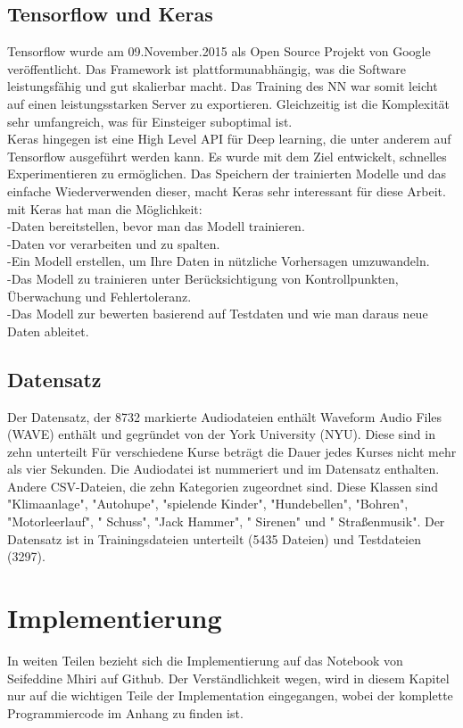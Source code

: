 \documentclass[a4paper,11pt]{article}
\theoremstyle{mytheor}
\begin{document}
\subsection{Tensorflow und Keras}
Tensorflow wurde am 09.November.2015 als Open Source Projekt
von Google veröffentlicht. Das Framework ist plattformunabhängig, was die Software leistungsfähig und gut skalierbar macht. Das Training des NN war somit leicht auf einen leistungsstarken Server zu exportieren. Gleichzeitig ist die Komplexität sehr umfangreich, was für Einsteiger suboptimal ist.\\
Keras hingegen ist eine High Level API für Deep learning, die unter anderem auf Tensorflow ausgeführt werden kann. Es wurde mit dem Ziel entwickelt, schnelles Experimentieren zu ermöglichen. Das Speichern der trainierten Modelle und das einfache Wiederverwenden dieser, macht Keras sehr interessant für diese Arbeit.\cite{Keras} 
\\ mit Keras hat man die Möglichkeit:
\\-Daten bereitstellen, bevor man das Modell trainieren.
\\-Daten vor verarbeiten und zu spalten.
\\-Ein Modell erstellen, um Ihre Daten in nützliche Vorhersagen umzuwandeln.
\\-Das Modell zu trainieren unter Berücksichtigung von Kontrollpunkten, Überwachung und Fehlertoleranz.
\\-Das Modell zur bewerten basierend auf Testdaten und wie man daraus neue Daten ableitet.

\subsection{Datensatz}
Der Datensatz, der 8732 markierte Audiodateien enthält Waveform Audio Files (WAVE) enthält und gegründet von der York University (NYU). Diese sind in zehn unterteilt Für verschiedene Kurse beträgt die Dauer jedes Kurses nicht mehr als vier Sekunden. Die Audiodatei ist nummeriert und im Datensatz enthalten. Andere CSV-Dateien, die zehn Kategorien zugeordnet sind. Diese Klassen sind "Klimaanlage", "Autohupe", "spielende Kinder", "Hundebellen", "Bohren", "Motorleerlauf", " Schuss", "Jack Hammer", " Sirenen" und " Straßenmusik". Der Datensatz ist in Trainingsdateien unterteilt (5435 Dateien) und Testdateien (3297).
\newpage
\section{Implementierung}
In weiten Teilen bezieht sich die Implementierung auf das Notebook
von Seifeddine Mhiri auf Github.
Der Verständlichkeit wegen, wird in diesem Kapitel nur
auf die wichtigen Teile der Implementation eingegangen, wobei
der komplette Programmiercode im Anhang zu finden ist.
\end{document}
